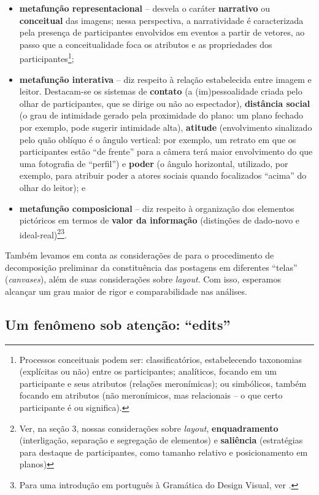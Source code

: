 \documentclass{textolivre}
\begin{document}
\begin{itemize}
\item \textbf{metafunção representacional} – desvela o caráter \textbf{narrativo} ou \textbf{conceitual} das imagens; nessa perspectiva, a narratividade é caracterizada pela presença de participantes envolvidos em eventos a partir de vetores, ao passo que a conceitualidade foca os atributos e as propriedades dos participantes\footnote{Processos conceituais podem ser: classificatórios, estabelecendo taxonomias (explícitas ou não) entre os participantes; analíticos, focando em um participante e seus atributos (relações meronímicas); ou simbólicos, também focando em atributos (não meronímicos, mas relacionais – o que certo participante é ou significa).};
\item \textbf{metafunção interativa} – diz respeito à relação estabelecida entre imagem e leitor.  Destacam-se os sistemas de \textbf{contato} (a (im)pessoalidade criada pelo olhar de participantes, que se dirige ou não ao espectador), \textbf{distância social} (o grau de intimidade gerado pela proximidade do plano: um plano fechado por exemplo, pode sugerir intimidade alta), \textbf{atitude} (envolvimento sinalizado pelo quão oblíquo é o ângulo vertical: por exemplo, um retrato em que os participantes estão “de frente” para a câmera terá maior envolvimento do que uma fotografia de “perfil”) e \textbf{poder} (o ângulo horizontal, utilizado, por exemplo, para atribuir poder a atores sociais quando focalizados “acima” do olhar do leitor); e
\item \textbf{metafunção composicional} – diz respeito à organização dos elementos pictóricos em termos de \textbf{valor da informação} (distinções de dado-novo e ideal-real)\footnote{Ver, na seção 3, nossas considerações sobre \textit{layout}, \textbf{enquadramento} (interligação, separação e segregação de elementos) e \textbf{saliência} (estratégias para destaque de participantes, como tamanho relativo e posicionamento em planos)}\footnote{Para uma introdução em português à Gramática do Design Visual, ver \textcite{nascimento2011}.}.
\end{itemize}

Também levamos em conta as considerações de \textcite{bateman2008,bateman2017} para o procedimento de decomposição preliminar da constituência das postagens em diferentes “telas” (\textit{canvases}), além de suas considerações sobre \textit{layout}. Com isso, esperamos alcançar um grau maior de rigor e comparabilidade nas análises.

\subsection{Um fenômeno sob atenção: “edits”}\label{sec-fenomeno}
\end{document}
